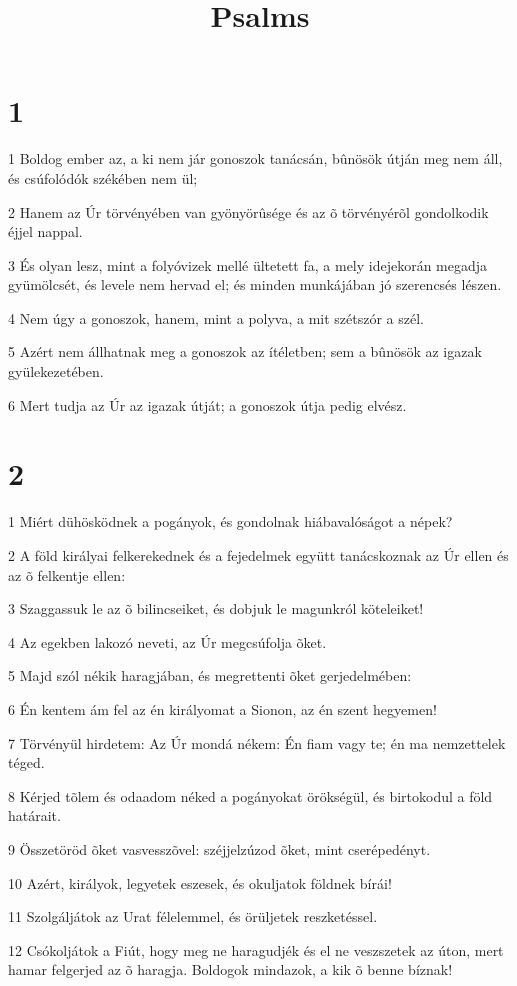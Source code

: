 

\title{Psalms}


\chapter{1}

\par 1 Boldog ember az, a ki nem jár gonoszok tanácsán, bûnösök útján meg nem áll, és csúfolódók székében nem ül;
\par 2 Hanem az Úr törvényében van gyönyörûsége és az õ törvényérõl gondolkodik éjjel nappal.
\par 3 És olyan lesz, mint a folyóvizek mellé ültetett fa, a mely idejekorán megadja gyümölcsét, és levele nem hervad el; és minden munkájában jó szerencsés lészen.
\par 4 Nem úgy a gonoszok, hanem, mint a polyva, a mit szétszór a szél.
\par 5 Azért nem állhatnak meg a gonoszok az ítéletben; sem a bûnösök az igazak gyülekezetében.
\par 6 Mert tudja az Úr az igazak útját; a gonoszok útja pedig elvész.

\chapter{2}

\par 1 Miért dühösködnek a pogányok, és gondolnak hiábavalóságot a népek?
\par 2 A föld királyai felkerekednek és a fejedelmek együtt tanácskoznak az Úr ellen és az õ felkentje ellen:
\par 3 Szaggassuk le az õ bilincseiket, és dobjuk le magunkról köteleiket!
\par 4 Az egekben lakozó neveti, az Úr megcsúfolja õket.
\par 5 Majd szól nékik haragjában, és megrettenti õket gerjedelmében:
\par 6 Én kentem ám fel az én királyomat a Sionon, az én szent hegyemen!
\par 7 Törvényül hirdetem: Az Úr mondá nékem: Én fiam vagy te; én ma nemzettelek téged.
\par 8 Kérjed tõlem és odaadom néked a pogányokat örökségül, és birtokodul a föld határait.
\par 9 Összetöröd õket vasvesszõvel: széjjelzúzod õket, mint cserépedényt.
\par 10 Azért, királyok, legyetek eszesek, és okuljatok földnek bírái!
\par 11 Szolgáljátok az Urat félelemmel, és örüljetek reszketéssel.
\par 12 Csókoljátok a Fiút, hogy meg ne haragudjék és el ne veszszetek az úton, mert hamar felgerjed az õ haragja. Boldogok mindazok, a kik õ benne bíznak!

